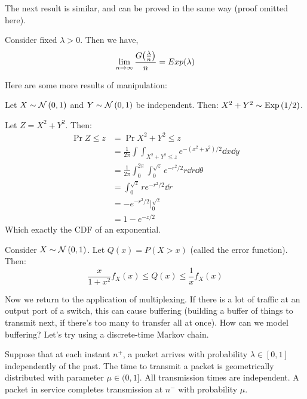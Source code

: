 The next result is similar, and can be proved in the same way (proof omitted here).

\begin{theorem}
    Consider fixed $\lambda > 0$. Then we have,
    \[ \lim_{n \to \infty} \frac{G\qty(\frac{\lambda}{n})}{n} = Exp(\lambda) \]
\end{theorem}

Here are some more results of manipulation:
\begin{theorem}
    Let $X \sim \mathcal{N}\left( 0, 1 \right)$ and $Y \sim \mathcal{N}\left( 0, 1 \right)$ be independent. Then: $X^2 + Y^2 \sim \text{Exp}\left( 1/2 \right)$.

    \begin{proof*}
        Let $Z = X^2 + Y^2$. Then:
        \begin{align*}
            \Pr{Z \leq z} &= \Pr{X^2 + Y^2 \leq z} \\
            &= \frac{1}{2\pi} \int \int_{X^2 + Y^2 \leq z} e^{-(x^2 + y^2)/2} \dd{x} \dd{y} \\
            &= \frac{1}{2\pi} \int_{0}^{2 \pi} \int_{0}^{\sqrt{z}} e^{-r^2/2} r \dd{r} \dd{\theta} \\
            &= \int_{0}^{\sqrt{z}} r e^{-r^2/2} \dd{r} \\
            &= - e^{-r^2/2} \Big|_0^{\sqrt{z}} \\
            &= 1 - e^{-z/2}
        \end{align*}
        Which exactly the CDF of an exponential.
    \end{proof*}
\end{theorem}

\begin{theorem}
    Consider $X \sim \mathcal{N}\left( 0, 1 \right)$. Let $Q(x) = P(X > x)$ (called the error function). Then:
    \[\frac{x}{1 + x^2} f_X(x) \leq Q(x) \leq \frac{1}{x} f_X(x)\]
\end{theorem}


Now we return to the application of multiplexing. If there is a lot of traffic at an output port of a switch,
this can cause buffering (building a buffer of things to transmit next, if there's too many to transfer all at once).
How can we model buffering? Let's try using a discrete-time Markov chain.

Suppose that at each instant $n^+$, a packet arrives with probability $\lambda \in [0, 1]$ independently
of the past. The time to transmit a packet is geometrically distributed with parameter $\mu \in (0, 1]$. All transmission
times are independent. A packet in service completes transmission at $n^-$ with probability $\mu$.

